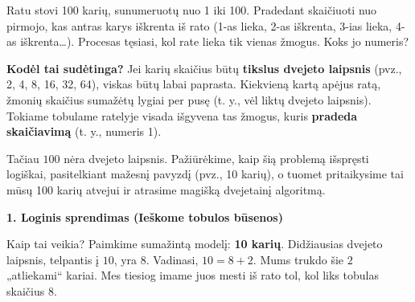 \documentclass[11pt,a4paper]{scrartcl}
\newenvironment{solution}
    {\begin{list}{}{\setlength{\leftmargin}{10pt}\setlength{\rightmargin}{10pt}}\item[]}
    {\end{list}}
\begin{document}
\begin{example}
Ratu stovi 100 karių, sunumeruotų nuo 1 iki 100. Pradedant skaičiuoti nuo pirmojo, kas antras karys iškrenta iš rato (1-as lieka, 2-as iškrenta, 3-ias lieka, 4-as iškrenta\dots). Procesas tęsiasi, kol rate lieka tik vienas žmogus. Koks jo numeris?
\end{example}
\begin{solution}
\textbf{Kodėl tai sudėtinga?} Jei karių skaičius būtų \textbf{tikslus dvejeto laipsnis} (pvz., 2, 4, 8, 16, 32, 64), viskas būtų labai paprasta. Kiekvieną kartą apėjus ratą, žmonių skaičius sumažėtų lygiai per pusę (t. y., vėl liktų dvejeto laipsnis). Tokiame tobulame ratelyje visada išgyvena tas žmogus, kuris \textbf{pradeda skaičiavimą} (t. y., numeris 1). 

Tačiau $100$ nėra dvejeto laipsnis. Pažiūrėkime, kaip šią problemą išspręsti logiškai, pasitelkiant mažesnį pavyzdį (pvz., 10 karių), o tuomet pritaikysime tai mūsų 100 karių atvejui ir atrasime magišką dvejetainį algoritmą.

\textbf{1. Loginis sprendimas (Ieškome tobulos būsenos)}

Kaip tai veikia? Paimkime sumažintą modelį: \textbf{10 karių}.
Didžiausias dvejeto laipsnis, telpantis į $10$, yra $8$. Vadinasi, $10 = 8 + 2$. Mums trukdo šie $2$ „atliekami“ kariai. Mes tiesiog imame juos mesti iš rato tol, kol liks tobulas skaičius $8$. 

\vspace{0.5cm}
\noindent
\begin{minipage}{0.45\textwidth}
\begin{center}
\end{center}
\end{minipage}
\end{solution}
\end{document}
